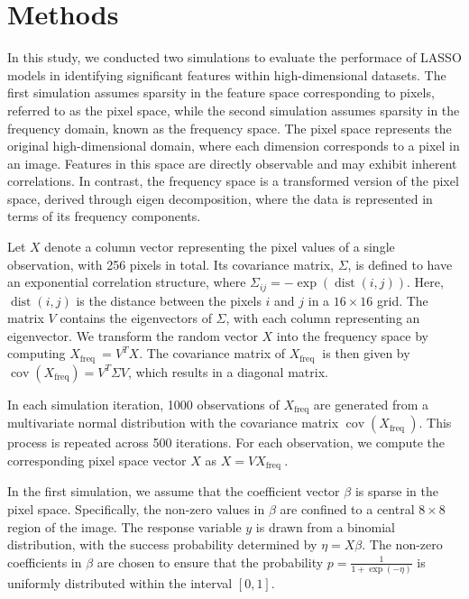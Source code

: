 \documentclass[12pt]{article}
\title{}
\author{Siyang Ren}
\begin{document}
\section*{Methods}

In this study, we conducted two simulations to evaluate the performace of LASSO models in identifying significant
features within high-dimensional datasets. The first simulation assumes sparsity in the feature space corresponding to
pixels, referred to as the pixel space, while the second simulation assumes sparsity in the frequency domain, known as
the frequency space. The pixel space represents the original high-dimensional domain, where each dimension corresponds
to a pixel in an image. Features in this space are directly observable and may exhibit inherent correlations. In
contrast, the frequency space is a transformed version of the pixel space, derived through eigen decomposition, where
the data is represented in terms of its frequency components.

Let \( X \) denote a column vector representing the pixel values of a single observation, with 256 pixels in total. Its
covariance matrix, \( \Sigma \), is defined to have an exponential correlation structure, where \( \Sigma_{i j}=-\exp
(\operatorname{dist}(i, j)) \). Here, \( \operatorname{dist}(i, j) \) is the distance between the pixels \( i \) and \(
j \) in a \( 16 \times 16 \) grid. The matrix \( V \) contains the eigenvectors of \( \Sigma \), with each column
representing an eigenvector. We transform the random vector \( X \) into the frequency space by computing \( X_{\text
		{freq }}=V^T X \). The covariance matrix of \( X_{\text {freq }} \) is then given by \(
\operatorname{cov}(X_{\mathrm{freq}})=V^T \Sigma V \), which results in a diagonal matrix.

In each simulation iteration, 1000 observations of \( X_{\text {freq}} \) are generated from a multivariate normal
distribution with the covariance matrix \(\operatorname{cov}\left(X_{\text {freq }}\right) \). This process is repeated
across 500 iterations.  For each observation, we compute the corresponding pixel space vector \( X \) as \( X=V X_{\text
		{freq }} \).

In the first simulation, we assume that the coefficient vector \( \beta \) is sparse in the pixel space. Specifically,
the non-zero values in \( \beta \) are confined to a central \( 8 \times 8 \) region of the image. The response variable
\( y \) is drawn from a binomial distribution, with the success probability determined by \( \eta = X \beta \). The
non-zero coefficients in \( \beta \) are chosen to ensure that the probability \( p = \frac{1}{1 + \exp(-\eta)} \) is
uniformly distributed within the interval \( [0, 1] \).
\end{document}

